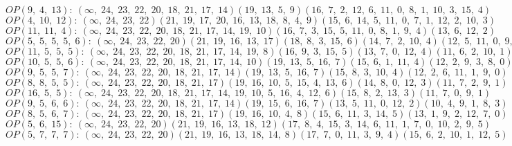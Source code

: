 $OP(9, \;4, \;13): \:(\infty, \;24, \;23, \;22, \;20, \;18, \;21, \;17, \;14)(19, \;13, \;5, \;9)(16, \;7, \;2, \;12, \;6, \;11, \;0, \;8, \;1, \;10, \;3, \;15, \;4)$\\
$OP(4, \;10, \;12): \:(\infty, \;24, \;23, \;22)(21, \;19, \;17, \;20, \;16, \;13, \;18, \;8, \;4, \;9)(15, \;6, \;14, \;5, \;11, \;0, \;7, \;1, \;12, \;2, \;10, \;3)$\\
$OP(11, \;11, \;4): \:(\infty, \;24, \;23, \;22, \;20, \;18, \;21, \;17, \;14, \;19, \;10)(16, \;7, \;3, \;15, \;5, \;11, \;0, \;8, \;1, \;9, \;4)(13, \;6, \;12, \;2)$\\
$OP(5, \;5, \;5, \;5, \;6): \:(\infty, \;24, \;23, \;22, \;20)(21, \;19, \;16, \;13, \;17)(18, \;8, \;3, \;15, \;6)(14, \;7, \;2, \;10, \;4)(12, \;5, \;11, \;0, \;9, \;1)$\\
$OP(11, \;5, \;5, \;5): \:(\infty, \;24, \;23, \;22, \;20, \;18, \;21, \;17, \;14, \;19, \;8)(16, \;9, \;3, \;15, \;5)(13, \;7, \;0, \;12, \;4)(11, \;6, \;2, \;10, \;1)$\\
$OP(10, \;5, \;5, \;6): \:(\infty, \;24, \;23, \;22, \;20, \;18, \;21, \;17, \;14, \;10)(19, \;13, \;5, \;16, \;7)(15, \;6, \;1, \;11, \;4)(12, \;2, \;9, \;3, \;8, \;0)$\\
$OP(9, \;5, \;5, \;7): \:(\infty, \;24, \;23, \;22, \;20, \;18, \;21, \;17, \;14)(19, \;13, \;5, \;16, \;7)(15, \;8, \;3, \;10, \;4)(12, \;2, \;6, \;11, \;1, \;9, \;0)$\\
$OP(8, \;8, \;5, \;5): \:(\infty, \;24, \;23, \;22, \;20, \;18, \;21, \;17)(19, \;16, \;10, \;5, \;15, \;4, \;13, \;6)(14, \;8, \;0, \;12, \;3)(11, \;7, \;2, \;9, \;1)$\\
$OP(16, \;5, \;5): \:(\infty, \;24, \;23, \;22, \;20, \;18, \;21, \;17, \;14, \;19, \;10, \;5, \;16, \;4, \;12, \;6)(15, \;8, \;2, \;13, \;3)(11, \;7, \;0, \;9, \;1)$\\
$OP(9, \;5, \;6, \;6): \:(\infty, \;24, \;23, \;22, \;20, \;18, \;21, \;17, \;14)(19, \;15, \;6, \;16, \;7)(13, \;5, \;11, \;0, \;12, \;2)(10, \;4, \;9, \;1, \;8, \;3)$\\
$OP(8, \;5, \;6, \;7): \:(\infty, \;24, \;23, \;22, \;20, \;18, \;21, \;17)(19, \;16, \;10, \;4, \;8)(15, \;6, \;11, \;3, \;14, \;5)(13, \;1, \;9, \;2, \;12, \;7, \;0)$\\
$OP(5, \;6, \;15): \:(\infty, \;24, \;23, \;22, \;20)(21, \;19, \;16, \;13, \;18, \;12)(17, \;8, \;4, \;15, \;3, \;14, \;6, \;11, \;1, \;7, \;0, \;10, \;2, \;9, \;5)$\\
$OP(5, \;7, \;7, \;7): \:(\infty, \;24, \;23, \;22, \;20)(21, \;19, \;16, \;13, \;18, \;14, \;8)(17, \;7, \;0, \;11, \;3, \;9, \;4)(15, \;6, \;2, \;10, \;1, \;12, \;5)$\\
